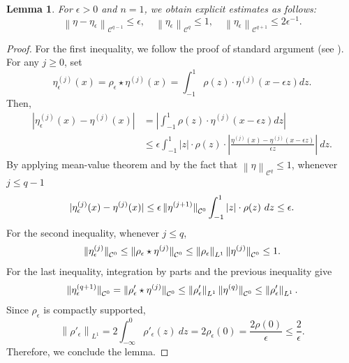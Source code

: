 \documentclass[a4paper,11pt]{amsart}
\newtheorem{lemma}[theorem]{Lemma}
\theoremstyle{remark}
\newcommand{\cC}{\mathcal{C}} %
\newcommand{\norm}[1]{\left\|#1\right\|} %
\begin{document}
\begin{lemma} 
    \label{lem:moll}
    For \(\epsilon > 0\) and $n = 1$, we obtain explicit estimates as follows:
    \begin{equation}
        \label{eq:bump-eta}
        \norm{\eta - \eta_{\epsilon}}_{\cC^{q-1}} \leq  \epsilon,
        \quad
        \norm{\eta_{\epsilon}}_{\cC^{q}} \leq 1,
        \quad
        \norm{\eta_{\epsilon}}_{\cC^{q+1}} \leq 2 \epsilon^{-1}.
    \end{equation}
\end{lemma}

\begin{proof}
    For the first inequality, we follow the proof of standard argument (see \cite[Theorem 4.1-(ii)]{EG15}).
    For any $j \geq 0$, set
    $$
        \eta_\epsilon^{(j)}(x)=\rho_\epsilon\star \eta^{(j)}(x)=\int_{-1}^{1}\rho(z)\cdot\eta^{(j)}(x-\epsilon z)dz.
    $$
    Then,
    \begin{align*}
        |\eta_\epsilon^{(j)}(x) - \eta^{(j)}(x)| & = \left|\int_{-1}^1 \rho(z)\cdot\eta^{(j)}(x-\epsilon z)dz\right|                                                      \\
                                                 & \leq \epsilon \int_{-1}^1|z|\cdot\rho(z)\cdot\left|\frac{\eta^{(j)}(x) - \eta^{(j)}(x-\epsilon z)}{\epsilon z} \right|\ dz.
    \end{align*}
    By applying mean-value theorem and by the fact that $\norm{\eta}_{\cC^{q}} \leq 1$, whenever $j\leq q-1$
    $$
        |\eta_\epsilon^{(j)}(x) - \eta^{(j)}(x)| \leq \epsilon\norm{\smash{\eta^{(j+1)}}}_{\cC^0} \int_{-1}^1|z|\cdot\rho(z)\ dz \leq \epsilon.
    $$
    For the second inequality, whenever $j\leq q$,
    $$
        \norm{\smash{\eta_\epsilon^{(j)}}}_{\cC^0} \leq \norm{\smash{\rho_\epsilon\star \eta^{(j)}}}_{\cC^0}  \leq \norm{\rho_\epsilon}_{L^1} \norm{\smash{\eta^{(j)}}}_{\cC^0} \leq 1.
    $$
    For the last inequality, integration by parts and the previous inequality give
    $$
        \norm{\smash{\eta_\epsilon^{(q+1)}}}_{\cC^0} = \norm{\smash{\rho'_\epsilon\star \eta^{(j)}}}_{\cC^0}  \leq \norm{\rho'_\epsilon}_{L^1} \norm{\smash{\eta^{(q)}}}_{\cC^0} \leq \norm{\rho'_\epsilon}_{L^1}.
    $$
    Since $\rho_\epsilon$ is compactly supported,
    $$
        \norm{\rho'_\epsilon}_{L^1} = 2 \int_{-\infty}^{0} \rho'_\epsilon(z)\ dz = 2\rho_\epsilon(0) = \frac{2\rho(0)}{\epsilon} \leq \frac{2}{\epsilon}.
    $$
    Therefore, we conclude the lemma.
\end{proof}
\end{document}
